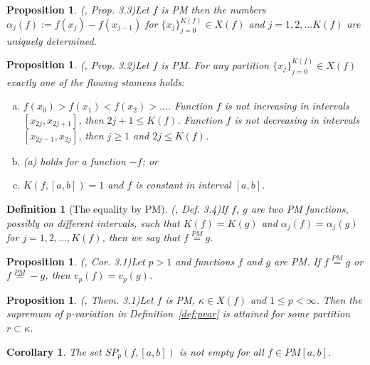 \documentclass[12pt, a4paper]{article}
\newtheorem{proposition}[theorem]{Proposition}
\newtheorem{definition}[theorem]{Definition}
\newtheorem{corollary}[theorem]{Corollary}
\numberwithin{equation}{section}
\begin{document}
\begin{proposition}(\cite{Qian}, Prop. 3.3)\label{prop:PM_Unique}
  Let $f$ is PM then the numbers 
  $\alpha_j(f):=f(x_j) - f(x_{j-1})$ for
  $\{ x_j \}_{j=0}^{K(f)} \in X(f)$ and 
  $j=1,2,\dots K(f)$
  are uniquely determined.
\end{proposition}  
 
 
\begin{proposition}(\cite{Qian}, Prop. 3.2)\label{prop:PM_form}
  Let $f$ is PM. For any partition 
  $\{ x_j \}_{j=0}^{K(f)} \in X(f)$ 
  exactly one of the flowing stamens holds:
  \begin{enumerate}[(a)]
   \item $f(x_0)>f(x_1)<f(x_2)>\dots$. 
     Function $f$ is not
     increasing in intervals $[x_{2j}, x_{2j+1}]$, 
     then $2j+1\leq K(f)$. 
     Function $f$ is not
     decreasing in intervals $[x_{2j-1}, x_{2j}]$, 
     then $j \geq 1$ and $2j\leq K(f)$.  
     
   \item (a) holds for a function $-f$; or
   \item $K(f, [a,b]) = 1$ and $f$ is constant in interval $[a,b]$.
  \end{enumerate}
  
  
\end{proposition}  
  
 
 
\begin{definition}[The equality by PM](\cite{Qian}, Def. 3.4)\label{def:EqPM}
  If $f$, $g$ are two PM functions, possibly on different intervals, such that 
  $K(f)=K(g)$ and $\alpha_j(f)=\alpha_j(g)$ for $j=1,2,\dots,K(f)$, then we say that
  $f \stackrel{PM}{=} g$.
\end{definition}    
  
\begin{proposition}(\cite{Qian}, Cor. 3.1)\label{prop:f_PM_g}
  Let $p>1$ and functions $f$ and $g$ are PM. 
  If $f \stackrel{PM}{=} g$ or $f \stackrel{PM}{=} -g$, then $v_p(f)=v_p(g)$.
\end{proposition} 

\begin{proposition}(\cite{Qian}, Them. 3.1)\label{prop:sup_in_PM}
  Let $f$ is PM, $\kappa \in X(f)$ and $1 \leq p < \infty$. 
  Then the supremum of $p$-variation in Definition~\ref{def:pvar}
  is attained for some partition $r \subset  \kappa$.
\end{proposition} 
\begin{corollary}\label{cor:SPNotEmpty}
  The set $SP_{p}(f,[a,b])$ is not empty for all $f \in PM[a,b]$.  
\end{corollary}
\end{document}
